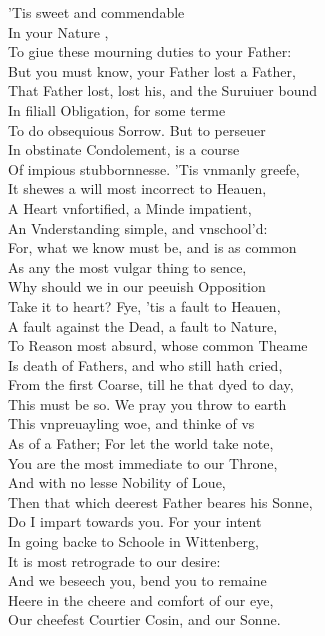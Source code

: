 \documentclass[a5paper,DIV=calc,11pt]{scrbook}
\begin{document}
\begin{drama*}
    \kingspeaks 'Tis sweet and commendable\\
    In your Nature \ham,\\
    To giue these mourning duties to your Father:\\
    But you must know, your Father lost a Father,\\
    That Father lost, lost his, and the Suruiuer bound\\
    In filiall Obligation, for some terme\\
    To do obsequious Sorrow. But to perseuer\\
    In obstinate Condolement, is a course\\
    Of impious stubbornnesse. 'Tis vnmanly greefe,\\
    It shewes a will most incorrect to Heauen,\\
    A Heart vnfortified, a Minde impatient,\\
    An Vnderstanding simple, and vnschool'd:\\
    For, what we know must be, and is as common\\
    As any the most vulgar thing to sence,\\
    Why should we in our peeuish Opposition\\
    Take it to heart? Fye, 'tis a fault to Heauen,\\
    A fault against the Dead, a fault to Nature,\\
    To Reason most absurd, whose common Theame\\
    Is death of Fathers, and who still hath cried,\\
    From the first Coarse, till he that dyed to day,\\
    This must be so. We pray you throw to earth\\
    This vnpreuayling woe, and thinke of vs\\
    As of a Father; For let the world take note,\\
    You are the most immediate to our Throne,\\
    And with no lesse Nobility of Loue,\\
    Then that which deerest Father beares his Sonne,\\
    Do I impart towards you. For your intent\\
    In going backe to Schoole in Wittenberg,\\
    It is most retrograde to our desire:\\
    And we beseech you, bend you to remaine\\
    Heere in the cheere and comfort of our eye,\\
    Our cheefest Courtier Cosin, and our Sonne.


\end{drama*}
\end{document}
